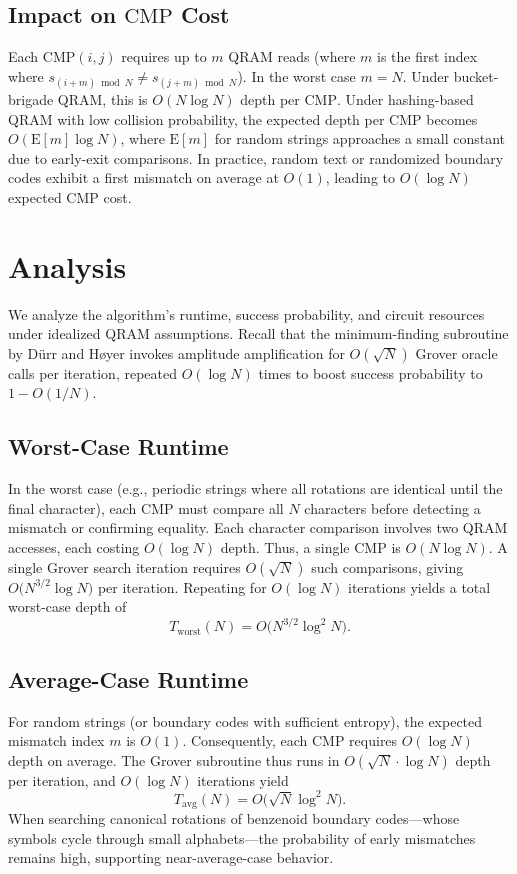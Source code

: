 \documentclass[11pt,letterpaper]{article}
\begin{document}
\subsection{Impact on \texorpdfstring{\(\mathrm{CMP}\)}{CMP} Cost}
Each \(\mathrm{CMP}(i,j)\) requires up to \(m\) QRAM reads (where \(m\) is the first index where \(s_{(i+m)\bmod N} \neq s_{(j+m)\bmod N}\)). In the worst case \(m = N\). Under bucket-brigade QRAM, this is \(O(N \log N)\) depth per \(\mathrm{CMP}\). Under hashing-based QRAM with low collision probability, the expected depth per \(\mathrm{CMP}\) becomes \(O(\mathrm{E}[m]\log N)\), where \(\mathrm{E}[m]\) for random strings approaches a small constant due to early-exit comparisons. In practice, random text or randomized boundary codes exhibit a first mismatch on average at \(O(1)\), leading to \(O(\log N)\) expected \(\mathrm{CMP}\) cost.

\section{Analysis}
\label{sec:analysis}
We analyze the algorithm's runtime, success probability, and circuit resources under idealized QRAM assumptions. Recall that the minimum-finding subroutine by D{\"u}rr and H{\o}yer invokes amplitude amplification \cite{brassard2002quantum} for \(O(\sqrt{N})\) Grover oracle calls per iteration, repeated \(O(\log N)\) times to boost success probability to \(1 - O(1/N)\).

\subsection{Worst-Case Runtime}
In the worst case (e.g., periodic strings where all rotations are identical until the final character), each \(\mathrm{CMP}\) must compare all \(N\) characters before detecting a mismatch or confirming equality. Each character comparison involves two QRAM accesses, each costing \(O(\log N)\) depth. Thus, a single \(\mathrm{CMP}\) is \(O(N\log N)\). A single Grover search iteration requires \(O(\sqrt{N})\) such comparisons, giving \(O\bigl(N^{3/2}\log N\bigr)\) per iteration. Repeating for \(O(\log N)\) iterations yields a total worst-case depth of
\[
T_{\mathrm{worst}}(N) = O\bigl(N^{3/2}\log^2 N\bigr).
\]

\subsection{Average-Case Runtime}
For random strings (or boundary codes with sufficient entropy), the expected mismatch index \(m\) is \(O(1)\). Consequently, each \(\mathrm{CMP}\) requires \(O(\log N)\) depth on average. The Grover subroutine thus runs in \(O(\sqrt{N} \cdot \log N)\) depth per iteration, and \(O(\log N)\) iterations yield
\[
T_{\mathrm{avg}}(N) = O\bigl(\sqrt{N}\log^2 N\bigr).
\]
When searching canonical rotations of benzenoid boundary codes---whose symbols cycle through small alphabets---the probability of early mismatches remains high, supporting near-average-case behavior.
\end{document}
